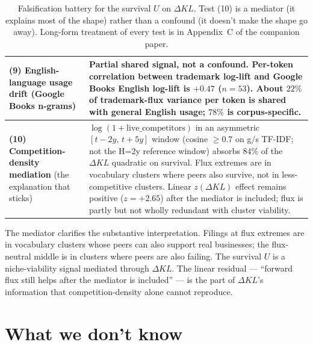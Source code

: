\documentclass[11pt]{article}
\begin{document}
\begin{table}[h]
\begin{tabular}{p{4.0cm}p{11.2cm}}
(9) English-language usage drift (Google Books n-grams) &
Partial shared signal, not a confound. Per-token correlation between
trademark log-lift and Google Books English log-lift is $+0.47$
($n = 53$). About $22\%$ of trademark-flux variance per token is
shared with general English usage; $78\%$ is corpus-specific. \\
\midrule
\textbf{(10) Competition-density mediation} (the explanation that
sticks) &
$\log(1 + \text{live\_competitors})$ in an asymmetric
$[t-2y,\, t+5y]$ window (cosine $\geq 0.7$ on g/s TF-IDF; not the
H=2y reference window) absorbs $84\%$ of the $\Delta KL$ quadratic
on survival. Flux extremes are in vocabulary clusters where peers
also survive, not in less-competitive clusters. Linear $z(\Delta KL)$
effect remains positive ($z = +2.65$) after the mediator is
included; flux is partly but not wholly redundant with cluster
viability. \\
\bottomrule
\end{tabular}
\caption{Falsification battery for the survival $U$ on $\Delta KL$.
Test (10) is a mediator (it explains most of the shape) rather than
a confound (it doesn't make the shape go away). Long-form treatment
of every test is in Appendix~C of the companion paper.}
\label{tab:short-falsification}
\end{table}

The mediator clarifies the substantive interpretation. Filings at
flux extremes are in vocabulary clusters whose peers can also support
real businesses; the flux-neutral middle is in clusters where peers
are also failing. The survival $U$ is a niche-viability signal
mediated through $\Delta KL$. The linear residual --- ``forward flux
still helps after the mediator is included'' --- is the part of
$\Delta KL$'s information that competition-density alone cannot
reproduce.

\section{What we don't know}
\end{document}
